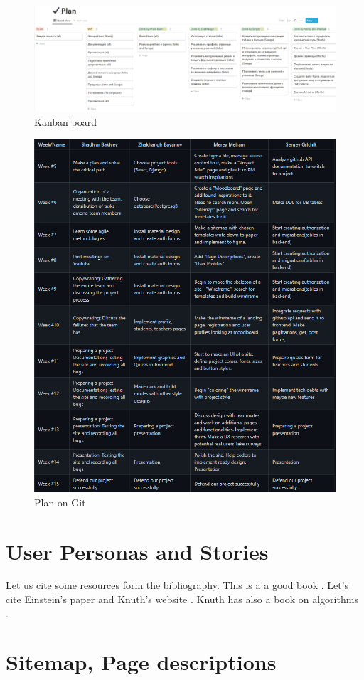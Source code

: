 \begin{figure}[ht]
    \centering
    \includegraphics[scale=0.5]{Kanbanbrd.png}
    \caption{Kanban board}
    \label{fig:knbrd}
\end{figure}
\begin{figure}[t]
    \centering
    \includegraphics[scale=0.5]{weeksplan.png}
    \caption{Plan on Git}
    \label{fig:weeksplan}
\end{figure}

\section{User Personas and Stories}

Let us cite some resources form the  bibliography. This is a a good book \cite{dirac}. Let's cite Einstein's paper \cite{einstein} and Knuth's website \cite{knuthwebsite}. Knuth has also a book on algorithms \cite{knuth-fa}.

\section{Sitemap, Page descriptions}